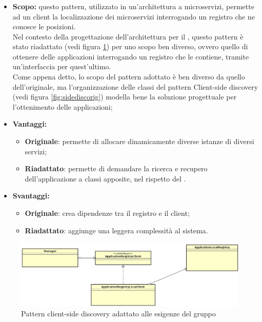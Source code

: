      \subsubsection{}\label{CS}
      \begin{itemize}
       \item \textbf{Scopo:} questo pattern, utilizzato in un'architettura a microservizi, permette ad un client la localizzazione dei microservizi interrogando un registro che ne conosce le posizioni. \\
       Nel contesto della progettazione dell'architettura per il  \PROGETTO, questo pattern è stato riadattato (vedi figura \ref{fig:sidedisc}) per uno scopo ben diverso, ovvero quello di ottenere delle applicazioni interrogando un registro che le contiene, tramite un'interfaccia per quest'ultimo. \\ Come appena detto, lo scopo del pattern adottato è ben diverso da quello dell'originale, ma l'organizzazione delle classi del pattern Client-side discovery (vedi figura \ref{fig:sidediscorig}) modella bene la soluzione progettuale per l'ottenimento delle applicazioni;
	\item \textbf{Vantaggi:}
     \begin{itemize}
	   \item \textbf{Originale}: permette di allocare dinamicamente diverse istanze di diversi servizi;
	   \item \textbf{Riadattato}: permette di demandare la ricerca e recupero dell'applicazione a classi apposite, nel rispetto del .
	  \end{itemize}
	\item \textbf{Svantaggi:}
	  \begin{itemize}
	   \item \textbf{Originale}: crea dipendenze tra il registro e il client;
	   \item \textbf{Riadattato}: aggiunge una leggera complessità al sistema.
	  \end{itemize}
	\end{itemize}
	 \begin{figure}[h]
	 	\centering
	 	\includegraphics[width=\textwidth,height=\textheight,keepaspectratio]{images/sidedisc.png}
	 	\caption{Pattern client-side discovery adattato alle esigenze del gruppo}\label{fig:sidedisc}
	 \end{figure}

